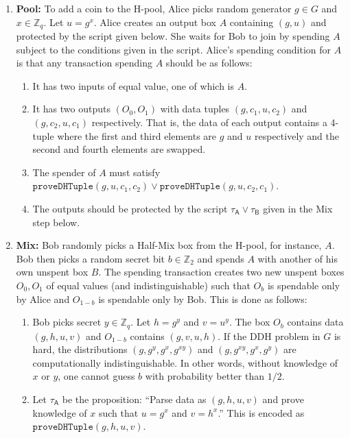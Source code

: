 \documentclass[11pt]{article}
\begin{document}
\begin{enumerate}
	\item \textbf{Pool:} To add a coin to the H-pool, Alice picks random generator $g\in G$ and $x\in \mathbb{Z}_q$. Let $u = g^{x}$. Alice creates an output box $A$ containing $(g, u)$ and protected by the script given below. She waits for Bob to join by spending $A$ subject to the conditions given in the script. 
	Alice's spending condition for $A$ is that any transaction spending $A$ should be as follows: 
	
	\begin{enumerate}
		\item It has two inputs of equal value, one of which is $A$. %
		\item It has two outputs $(O_0, O_1)$ with data tuples $(g, c_1, u, c_2)$ and $(g, c_2, u, c_1)$ respectively. That is, the data of each output contains a 4-tuple where the first and third elements are $g$ and $u$ respectively and the second and fourth elements are swapped. 
		\item The spender of $A$ must satisfy $\texttt{proveDHTuple}(g, u, c_1, c_2)\lor \texttt{proveDHTuple}(g, u, c_2, c_1)$.
		\item The outputs should be protected by the script $\tau_\textsf{A} \lor \tau_\textsf{B}$ given in the Mix step below.
	\end{enumerate}
	
	
	\item \textbf{Mix:} Bob randomly picks a Half-Mix box from the H-pool, for instance, $A$. Bob then picks a random secret bit $b \in \mathbb{Z}_2$ and spends $A$ with another of his own unspent box $B$. The spending transaction creates two new unspent boxes $O_0, O_1$ of equal values (and indistinguishable) such that $O_b$ is spendable only by Alice and $O_{1-b}$ is spendable only by Bob. This is done as follows:
	
	\begin{enumerate}
		\item Bob picks secret $y\in \mathbb{Z}_q$. Let $h = {g}^{y}$ and $v = {u}^{y}$.  %
		The box $O_b$ contains data $(g, h, u, v)$ and $O_{1-b}$ contains $(g, v, u, h)$. If the DDH problem in $G$ is hard, the distributions $(g, {g}^{y}, {g}^{x}, {g}^{xy})$ and 
		$(g, {g}^{xy}, {g}^{x}, {g}^{y})$ are computationally indistinguishable. In other words, without knowledge of $x$ or $y$, one cannot guess $b$ with probability better than $1/2$.
		\item  Let 
		$\tau_\textsf{A}$ be the proposition: ``Parse data as $(g, h, u, v)$ and
		prove knowledge of $x$ such that $u = {g}^{x}$ and ${v} = {h}^{x}$.'' This is encoded as $\texttt{proveDHTuple}(g, h, u, v)$.
		

\end{enumerate}
\end{enumerate}
\end{document}
